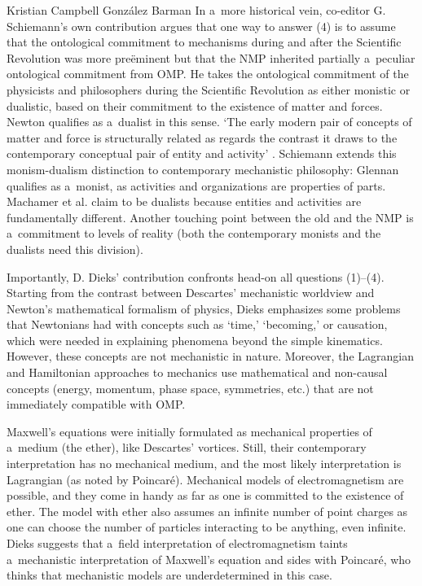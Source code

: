 \begin{recengenv}{Kristian Campbell González Barman}
In a~more historical vein, co-editor G. Schiemann's own contribution argues that one way to answer (4) is to assume that the ontological commitment to mechanisms during and after the Scientific Revolution was more preëminent but that the NMP inherited partially a~peculiar ontological commitment from OMP. He takes the ontological commitment of the physicists and philosophers during the Scientific Revolution as either monistic or dualistic, based on their commitment to the existence of matter and forces. Newton qualifies as a~dualist in this sense. ‘The early modern pair of concepts of matter and force is structurally related as regards the contrast it draws to the contemporary conceptual pair of entity and activity'
\parencite*[][p.43]{falkenburg_mechanistic_2019}. %
 Schiemann extends this monism-dualism distinction to contemporary mechanistic philosophy: Glennan qualifies as a~monist, as activities and organizations are properties of parts. Machamer et al. claim to be dualists because entities and activities are fundamentally different. Another touching point between the old and the NMP is a~commitment to levels of reality (both the contemporary monists and the dualists need this division).

Importantly, D. Dieks' contribution confronts head-on all questions (1)–(4). Starting from the contrast between Descartes' mechanistic worldview and Newton's mathematical formalism of physics, Dieks emphasizes some problems that Newtonians had with concepts such as ‘time,' ‘becoming,' or causation, which were needed in explaining phenomena beyond the simple kinematics. However, these concepts are not mechanistic in nature. Moreover, the Lagrangian and Hamiltonian approaches to mechanics use mathematical and non-causal concepts (energy, momentum, phase space, symmetries, etc.) that are not immediately compatible with OMP.

Maxwell's equations were initially formulated as mechanical properties of a~medium (the ether), like Descartes' vortices. Still, their contemporary interpretation has no mechanical medium, and the most likely interpretation is Lagrangian (as noted by Poincaré). Mechanical models of electromagnetism are possible, and they come in handy as far as one is committed to the existence of ether. The model with ether also assumes an infinite number of point charges as one can choose the number of particles interacting to be anything, even infinite. Dieks suggests that a~field interpretation of electromagnetism taints a~mechanistic interpretation of Maxwell's equation and sides with Poincaré, who thinks that mechanistic models are underdetermined in this case.


\end{recengenv}
